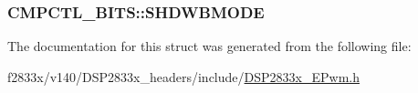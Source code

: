\subsubsection[{S\+H\+D\+W\+B\+M\+O\+D\+E}]{ C\+M\+P\+C\+T\+L\+\_\+\+B\+I\+T\+S\+::\+S\+H\+D\+W\+B\+M\+O\+D\+E}\label{struct_c_m_p_c_t_l___b_i_t_s_ab25286ed3730d338163a66f5c5199204}


The documentation for this struct was generated from the following file\+:\begin{DoxyCompactItemize}
\item 
f2833x/v140/\+D\+S\+P2833x\+\_\+headers/include/\hyperlink{_d_s_p2833x___e_pwm_8h}{D\+S\+P2833x\+\_\+\+E\+Pwm.\+h}\end{DoxyCompactItemize}
